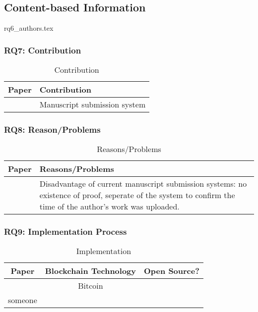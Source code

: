 
\subsection{Content-based Information}
\label{subsec:ContentBasedInformation}

{rq6_authors.tex}

\clearpage
\subsubsection{RQ7: Contribution}

\begin{longtable}{ |c|p{6cm}| }
	\caption{Contribution} \\
	\hline
 	\textbf{Paper} & \textbf{Contribution} \\ [0.5ex] 
 	\hline\hline
 	\endhead
 	\cite{2017_Gipp} & Manuscript submission system\\
	\hline
\end{longtable}

\clearpage
\subsubsection{RQ8: Reason/Problems}

\begin{longtable}{ |c|p{6cm}| }
	\caption{Reasons/Problems}
	\label{tab:rq8_reason_problem}\\
	\hline
 	\textbf{Paper} & \textbf{Reasons/Problems} \\ [0.5ex] 
 	\hline\hline
 	\endhead
 	\cite{2017_Gipp} & Disadvantage of current manuscript submission systems: no existence of proof, seperate of the system to confirm the time of the author's work was uploaded.\\
	\hline
\end{longtable}

\clearpage
\subsubsection{RQ9: Implementation Process}

\begin{longtable}{ |c|c|c| }
	\caption{Implementation}
	\label{tab:rq9_implementation_process}\\
	\hline
 	\textbf{Paper} & Blockchain Technology & \textbf{Open Source?} \\ [0.5ex] 
 	\hline\hline
 	\endhead
 	\cite{2017_Gipp} & Bitcoin & \cmark \\
	\hline
	someone & \xmark \\
	\hline
\end{longtable}

